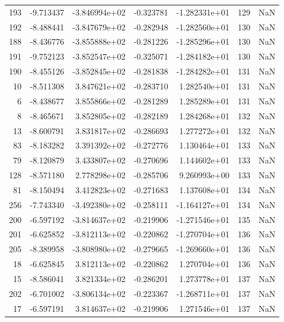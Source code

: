 \begin{tabular}{rrrrrrr}
 193 &  -9.713437 & -3.846994e+02 & -0.323781 & -1.282331e+01 &         129 & NaN \\
 192 &  -8.488441 & -3.847679e+02 & -0.282948 & -1.282560e+01 &         130 & NaN \\
 188 &  -8.436776 & -3.855888e+02 & -0.281226 & -1.285296e+01 &         130 & NaN \\
 191 &  -9.752123 & -3.852547e+02 & -0.325071 & -1.284182e+01 &         130 & NaN \\
 190 &  -8.455126 & -3.852845e+02 & -0.281838 & -1.284282e+01 &         131 & NaN \\
  10 &  -8.511308 &  3.847621e+02 & -0.283710 &  1.282540e+01 &         131 & NaN \\
   6 &  -8.438677 &  3.855866e+02 & -0.281289 &  1.285289e+01 &         131 & NaN \\
   8 &  -8.465671 &  3.852805e+02 & -0.282189 &  1.284268e+01 &         132 & NaN \\
  13 &  -8.600791 &  3.831817e+02 & -0.286693 &  1.277272e+01 &         132 & NaN \\
  83 &  -8.183282 &  3.391392e+02 & -0.272776 &  1.130464e+01 &         133 & NaN \\
  79 &  -8.120879 &  3.433807e+02 & -0.270696 &  1.144602e+01 &         133 & NaN \\
 128 &  -8.571180 &  2.778298e+02 & -0.285706 &  9.260993e+00 &         133 & NaN \\
  81 &  -8.150494 &  3.412823e+02 & -0.271683 &  1.137608e+01 &         134 & NaN \\
 256 &  -7.743340 & -3.492380e+02 & -0.258111 & -1.164127e+01 &         134 & NaN \\
 200 &  -6.597192 & -3.814637e+02 & -0.219906 & -1.271546e+01 &         135 & NaN \\
 201 &  -6.625852 & -3.812113e+02 & -0.220862 & -1.270704e+01 &         136 & NaN \\
 205 &  -8.389958 & -3.808980e+02 & -0.279665 & -1.269660e+01 &         136 & NaN \\
  18 &  -6.625845 &  3.812113e+02 & -0.220862 &  1.270704e+01 &         136 & NaN \\
  15 &  -8.586041 &  3.821334e+02 & -0.286201 &  1.273778e+01 &         137 & NaN \\
 202 &  -6.701002 & -3.806134e+02 & -0.223367 & -1.268711e+01 &         137 & NaN \\
  17 &  -6.597191 &  3.814637e+02 & -0.219906 &  1.271546e+01 &         137 & NaN \\

\end{tabular}
